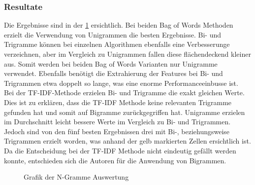 \subsubsection{Resultate}
Die Ergebnisse sind in der \cref{abb:ngram} ersichtlich.
Bei beiden \glqq Bag of Words\grqq{} Methoden erzielt die Verwendung von Unigrammen die besten Ergebnisse.
Bi- und Trigramme können bei einzelnen Algorithmen ebenfalls eine Verbesserunge verzeichnen, aber im Vergleich zu Unigrammen fallen diese flächendeckend kleiner aus.
Somit werden bei beiden \glqq Bag of Words\grqq{} Varianten nur Unigramme verwendet.
Ebenfalls benötigt die Extrahierung der Features bei Bi- und Trigrammen etwa doppelt so lange, was eine enorme Performanceeinbusse ist.\\
Bei der TF-IDF-Methode erzielen Bi- und Trigramme die exakt gleichen Werte.
Dies ist zu erklären, dass die TF-IDF Methode keine relevanten Trigramme gefunden hat und somit auf Bigramme zurückgegriffen hat.
Unigramme erzielen im Durchschnitt leicht bessere Werte im Vergleich zu Bi- und Trigrammen.
Jedoch sind von den fünf besten Ergebnissen drei mit Bi-, beziehungsweise Trigrammen erzielt worden, was anhand der gelb markierten Zellen ersichtlich ist.
Da die Entscheidung bei der TF-IDF Methode nicht eindeutig gefällt werden konnte, entschieden sich die Autoren für die Anwendung von Bigrammen.
\begin{figure}[H]	
	\setlength{\fboxsep}{0.3pt} 
	\setlength{\fboxrule}{0.3pt} 
	\caption{Grafik der N-Gramme Auswertung}
	\label{abb:ngram}
\end{figure}
